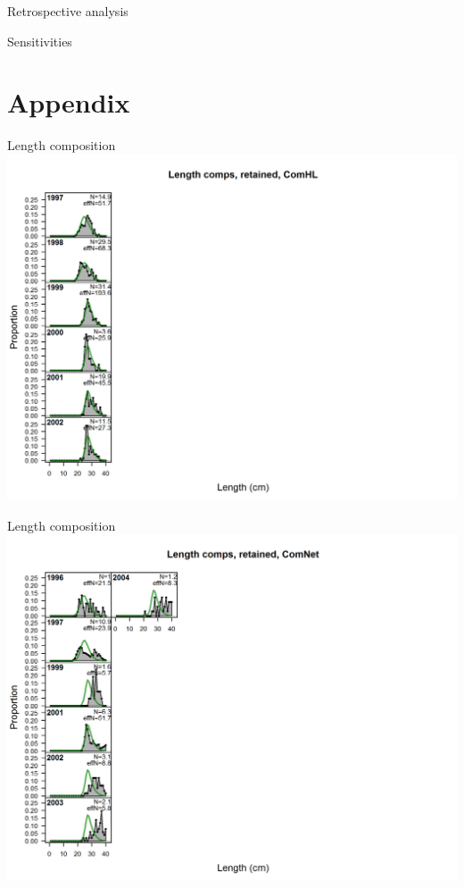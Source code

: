 \documentclass[ignorenonframetext,compress]{beamer}
\begin{document}
\begin{frame}{Retrospective analysis}

\end{frame}

\begin{frame}{Sensitivities}

\end{frame}

\section{Appendix}\label{appendix}

\begin{frame}{Length composition}\includegraphics{./r4ss/plots_mod1/comp_lenfit_flt1mkt2.png}\end{frame}

\begin{frame}{Length composition}\includegraphics{./r4ss/plots_mod1/comp_lenfit_flt2mkt2.png}\end{frame}
\end{document}
